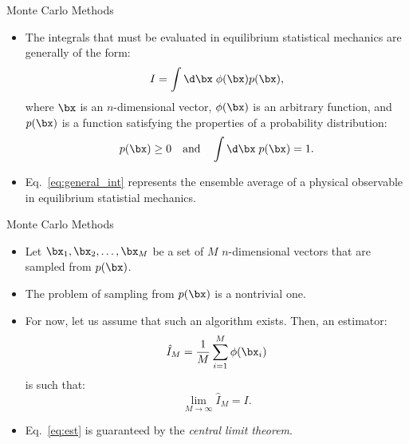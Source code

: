 \documentclass[10pt]{beamer}
\begin{document}
\begin{frame}{Monte Carlo Methods}
\begin{itemize}
\setlength\itemsep{1em}
  \item The integrals that must be evaluated in equilibrium statistical mechanics are generally of the form:
  \begin{equation}
  \label{eq:general_int}
    I = \int\d \bx\; \phi(\bx) p(\bx),
  \end{equation}
  where $\bx$ is an $n$-dimensional vector, $\phi(\bx)$ is an arbitrary function, and $p(\bx)$ is a function satisfying the properties of a probability distribution:
  \begin{equation}
    p(\bx)\geq 0~~~\mathrm{and}~~~\int\d\bx\; p(\bx) = 1.
  \end{equation}

  \item Eq.~\ref{eq:general_int} represents the ensemble average of a physical observable in equilibrium statistial mechanics.
\end{itemize}
\end{frame}

\begin{frame}{Monte Carlo Methods}
\begin{itemize}
\setlength\itemsep{1em}
  \item Let $\bx_1, \bx_2, \dots, \bx_M$ be a set of $M$ $n$-dimensional vectors that are sampled from $p(\bx)$.

  \item The problem of sampling from $p(\bx)$ is a nontrivial one.

  \item For now, let us assume that such an algorithm exists. Then, an estimator:
  \begin{equation}
    \hat{I}_M = \frac{1}{M}\sum_{i=1}^M \phi(\bx_i)
  \end{equation}
  is such that:
  \begin{equation}
  \label{eq:est}
    \lim_{M\rightarrow\infty} \hat{I}_M = I.
  \end{equation}

  \item Eq.~\ref{eq:est} is guaranteed by the \textit{central limit theorem}.
\end{itemize}
\end{frame}
\end{document}
